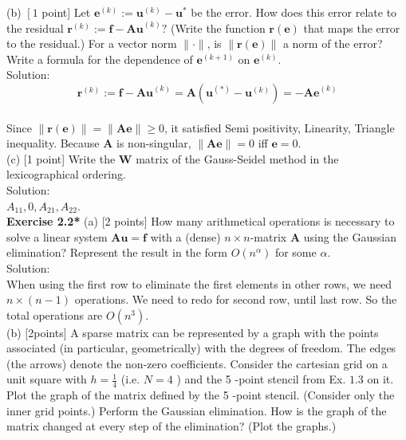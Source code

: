 \documentclass[a4paper]{article}
\begin{document}
\noindent (b) $\left[1\right.$ point] Let $\mathbf{e}^{(k)}:=\mathbf{u}^{(k)}-\mathbf{u}^{*}$ be the error. How does this error relate to the residual $\mathbf{r}^{(k)}:=\mathbf{f}-\mathbf{A u}^{(k)} ?$ (Write the function $\mathbf{r}(\mathbf{e})$ that maps the error to the residual.) For a vector norm $\|\cdot\|$, is $\|\mathbf{r}(\mathbf{e})\|$ a norm of the error? Write a formula for the dependence of $\mathbf{e}^{(k+1)}$ on $\mathbf{e}^{(k)}$.\\

\noindent Solution:\\
\noindent $$
\mathbf{r}^{\left( k \right)}:=\mathbf{f}-\mathbf{Au}^{\left( k \right)}=\mathbf{A}\left( \mathbf{u}^{\left( * \right)}-\mathbf{u}^{\left( k \right)} \right) =-\mathbf{Ae}^{\left( k \right)}
$$
\\
Since $\| \mathbf{r}\left( \mathbf{e} \right) \| =\| \mathbf{Ae} \|\ge 0$, it satisfied Semi positivity, Linearity, Triangle inequality. Because $\mathbf{A}$ is non-singular, $\| \mathbf{Ae} \|= 0$ iff $\mathbf{e}= 0$.\\

\noindent (c) [1 point] Write the $\mathbf{W}$ matrix of the Gauss-Seidel method in the lexicographical ordering.\\

\noindent Solution:\\

\noindent $A_{11},0,A_{21},A_{22}$.\\

\noindent \textbf{Exercise 2.2*} (a) [2 points] How many arithmetical operations is necessary to solve a linear system $\mathbf{A u}=\mathbf{f}$ with a (dense) $n \times n$-matrix $\mathbf{A}$ using the Gaussian elimination? Represent the result in the form $O\left(n^{\alpha}\right)$ for some $\alpha$.\\

\noindent Solution:\\

\noindent When using the first row to eliminate the first elements in other rows, we need $ n\times \left( n-1 \right) $
operations. We need to redo for second row, until last row. So the total operations are $ O\left( n^3 \right) $.\\

\noindent (b) [2points] A sparse matrix can be represented by a graph with the points associated (in particular, geometrically) with the degrees of freedom. The edges (the arrows) denote the non-zero coefficients. Consider the cartesian grid on a unit square with $h=\frac{1}{4}$ (i.e. $N=4$ ) and the 5 -point stencil from Ex. $1.3$ on it. Plot the graph of the matrix defined by the 5 -point stencil. (Consider only the inner grid points.) Perform the Gaussian elimination. How is the graph of the matrix changed at every step of the elimination? (Plot the graphs.)\\
\end{document}
